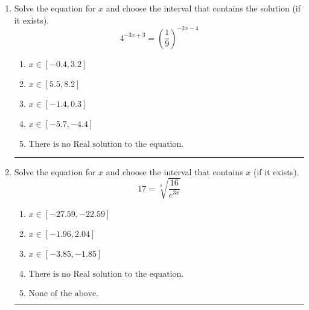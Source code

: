 \documentclass[14pt]{extbook}
\newcommand{\litem}[1]{\item#1\hspace*{-1cm}\rule{\textwidth}{0.4pt}}
\begin{document}
\begin{enumerate}
{\begin{enumerate}[label=\Alph*.]
\end{enumerate} }
\litem{
Solve the equation for $x$ and choose the interval that contains the solution (if it exists).\[ 4^{-3x+3} = \left(\frac{1}{9}\right)^{-2x-4} \]\begin{enumerate}[label=\Alph*.]
\item \( x \in [-0.4, 3.2] \)
\item \( x \in [5.5, 8.2] \)
\item \( x \in [-1.4, 0.3] \)
\item \( x \in [-5.7, -4.4] \)
\item \( \text{There is no Real solution to the equation.} \)

\end{enumerate} }
\litem{
 Solve the equation for $x$ and choose the interval that contains $x$ (if it exists).\[  17 = \sqrt[4]{\frac{16}{e^{3x}}} \]\begin{enumerate}[label=\Alph*.]
\item \( x \in [-27.59, -22.59] \)
\item \( x \in [-1.96, 2.04] \)
\item \( x \in [-3.85, -1.85] \)
\item \( \text{There is no Real solution to the equation.} \)
\item \( \text{None of the above.} \)

\end{enumerate} }
\end{enumerate}
\end{document}

